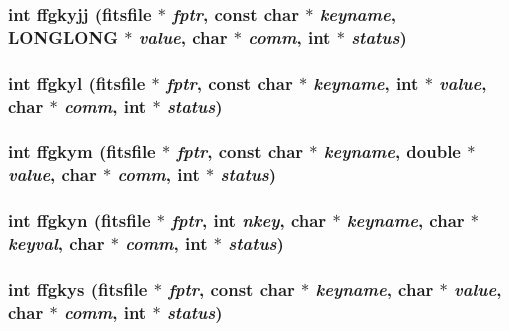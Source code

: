 \subsubsection{\setlength{\rightskip}{0pt plus 5cm}int ffgkyjj (\bf{fitsfile} $\ast$ {\em fptr}, const char $\ast$ {\em keyname}, \bf{LONGLONG} $\ast$ {\em value}, char $\ast$ {\em comm}, int $\ast$ {\em status})}\label{fitsio_8h_6ad49eda5b9e0d9b57def9abc3f60fe5}


\subsubsection{\setlength{\rightskip}{0pt plus 5cm}int ffgkyl (\bf{fitsfile} $\ast$ {\em fptr}, const char $\ast$ {\em keyname}, int $\ast$ {\em value}, char $\ast$ {\em comm}, int $\ast$ {\em status})}\label{fitsio_8h_514f9731bc6c8ba190dccd5d4744f841}


\subsubsection{\setlength{\rightskip}{0pt plus 5cm}int ffgkym (\bf{fitsfile} $\ast$ {\em fptr}, const char $\ast$ {\em keyname}, double $\ast$ {\em value}, char $\ast$ {\em comm}, int $\ast$ {\em status})}\label{fitsio_8h_8e2c807fdca3339d4789efea6f71f64a}


\subsubsection{\setlength{\rightskip}{0pt plus 5cm}int ffgkyn (\bf{fitsfile} $\ast$ {\em fptr}, int {\em nkey}, char $\ast$ {\em keyname}, char $\ast$ {\em keyval}, char $\ast$ {\em comm}, int $\ast$ {\em status})}\label{fitsio_8h_767eade3619fc0d0f2642f25121b2f70}


\subsubsection{\setlength{\rightskip}{0pt plus 5cm}int ffgkys (\bf{fitsfile} $\ast$ {\em fptr}, const char $\ast$ {\em keyname}, char $\ast$ {\em value}, char $\ast$ {\em comm}, int $\ast$ {\em status})}\label{fitsio_8h_556303d192d9b46c3fa0950d058f6245}


